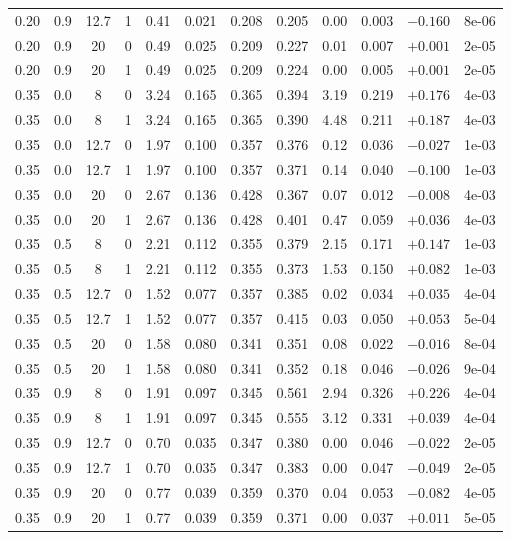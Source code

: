 \documentclass[aps,pra,onecolumn,notitlepage,superscriptaddress,nofootinbib,floatfix]{revtex4-2}
\begin{document}
\begin{table}[htbp]
\begin{tabular}{@{}cccccccccccc@{}}
0.20 & 0.9 & 12.7 & 1 & 0.41 & 0.021 & 0.208 & 0.205 & 0.00 & 0.003 & $-0.160$ & 8e-06 \\
0.20 & 0.9 & 20 & 0 & 0.49 & 0.025 & 0.209 & 0.227 & 0.01 & 0.007 & $+0.001$ & 2e-05 \\
0.20 & 0.9 & 20 & 1 & 0.49 & 0.025 & 0.209 & 0.224 & 0.00 & 0.005 & $+0.001$ & 2e-05 \\
0.35 & 0.0 & 8 & 0 & 3.24 & 0.165 & 0.365 & 0.394 & 3.19 & 0.219 & $+0.176$ & 4e-03 \\
0.35 & 0.0 & 8 & 1 & 3.24 & 0.165 & 0.365 & 0.390 & 4.48 & 0.211 & $+0.187$ & 4e-03 \\
0.35 & 0.0 & 12.7 & 0 & 1.97 & 0.100 & 0.357 & 0.376 & 0.12 & 0.036 & $-0.027$ & 1e-03 \\
0.35 & 0.0 & 12.7 & 1 & 1.97 & 0.100 & 0.357 & 0.371 & 0.14 & 0.040 & $-0.100$ & 1e-03 \\
0.35 & 0.0 & 20 & 0 & 2.67 & 0.136 & 0.428 & 0.367 & 0.07 & 0.012 & $-0.008$ & 4e-03 \\
0.35 & 0.0 & 20 & 1 & 2.67 & 0.136 & 0.428 & 0.401 & 0.47 & 0.059 & $+0.036$ & 4e-03 \\
0.35 & 0.5 & 8 & 0 & 2.21 & 0.112 & 0.355 & 0.379 & 2.15 & 0.171 & $+0.147$ & 1e-03 \\
0.35 & 0.5 & 8 & 1 & 2.21 & 0.112 & 0.355 & 0.373 & 1.53 & 0.150 & $+0.082$ & 1e-03 \\
0.35 & 0.5 & 12.7 & 0 & 1.52 & 0.077 & 0.357 & 0.385 & 0.02 & 0.034 & $+0.035$ & 4e-04 \\
0.35 & 0.5 & 12.7 & 1 & 1.52 & 0.077 & 0.357 & 0.415 & 0.03 & 0.050 & $+0.053$ & 5e-04 \\
0.35 & 0.5 & 20 & 0 & 1.58 & 0.080 & 0.341 & 0.351 & 0.08 & 0.022 & $-0.016$ & 8e-04 \\
0.35 & 0.5 & 20 & 1 & 1.58 & 0.080 & 0.341 & 0.352 & 0.18 & 0.046 & $-0.026$ & 9e-04 \\
0.35 & 0.9 & 8 & 0 & 1.91 & 0.097 & 0.345 & 0.561 & 2.94 & 0.326 & $+0.226$ & 4e-04 \\
0.35 & 0.9 & 8 & 1 & 1.91 & 0.097 & 0.345 & 0.555 & 3.12 & 0.331 & $+0.039$ & 4e-04 \\
0.35 & 0.9 & 12.7 & 0 & 0.70 & 0.035 & 0.347 & 0.380 & 0.00 & 0.046 & $-0.022$ & 2e-05 \\
0.35 & 0.9 & 12.7 & 1 & 0.70 & 0.035 & 0.347 & 0.383 & 0.00 & 0.047 & $-0.049$ & 2e-05 \\
0.35 & 0.9 & 20 & 0 & 0.77 & 0.039 & 0.359 & 0.370 & 0.04 & 0.053 & $-0.082$ & 4e-05 \\
0.35 & 0.9 & 20 & 1 & 0.77 & 0.039 & 0.359 & 0.371 & 0.00 & 0.037 & $+0.011$ & 5e-05 \\

\end{tabular}
\end{table}
\end{document}
